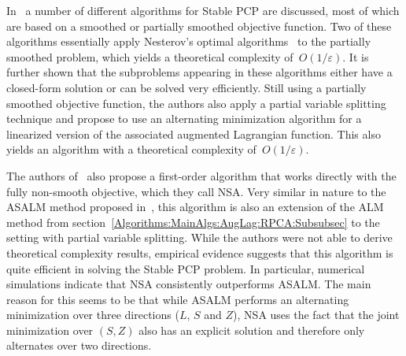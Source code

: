 In~\cite{Aybat:2011vn} a number of different algorithms for Stable PCP are discussed, most of which are based on a smoothed or partially smoothed objective function. Two of these algorithms essentially apply Nesterov's optimal algorithms~\cite{Nesterov:2005fk} to the partially smoothed problem, which yields a theoretical complexity of~$O(1/\varepsilon)$. It is further shown that the subproblems appearing in these algorithms either have a closed-form solution or can be solved very efficiently. Still using a partially smoothed objective function, the authors also apply a partial variable splitting technique and propose to use an alternating minimization algorithm for a linearized version of the associated augmented Lagrangian function. This also yields an algorithm with a theoretical complexity of~$O(1/\varepsilon)$. 

The authors of~\cite{Aybat:2011vn} also propose a first-order algorithm that works directly with the fully non-smooth objective, which they call NSA. Very similar in nature to the ASALM method proposed in~\cite{Tao:2011vn}, this algorithm is also an extension of the ALM method from section~\ref{Algorithms:MainAlgs:AugLag:RPCA:Subsubsec} to the setting with partial variable splitting. While the authors were not able to derive theoretical complexity results, empirical evidence suggests that this algorithm is quite efficient in solving the Stable PCP problem. In particular, numerical simulations indicate that NSA consistently outperforms ASALM. The main reason for this seems to be that while ASALM performs an alternating minimization over three directions ($L$, $S$ and $Z$), NSA uses the fact that the joint minimization over $(S,Z)$ also has an explicit solution and therefore only alternates over two directions. 


%
%


%  

